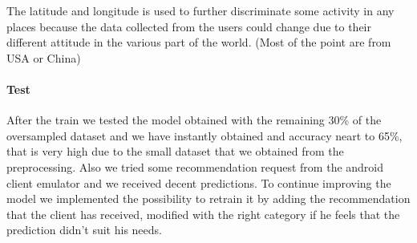 \documentclass[../../main]{subfiles}
\begin{document}
The latitude and longitude is used to further discriminate some activity in any places because the data collected from the users could change due to their different attitude in the various part of the world.
(Most of the point are from USA or China)
\paragraph*{Test}
After the train we tested the model obtained with the remaining 30\% of the oversampled dataset and we have instantly obtained and accuracy neart to 65\%, that is very high due to the small dataset that we obtained from the preprocessing.
Also we tried some recommendation request from the android client emulator and we received decent predictions. To continue improving the model we implemented the possibility to retrain it by adding the recommendation that the client has received, modified with the right category if he feels that the prediction didn't suit his needs. 
\end{document}
